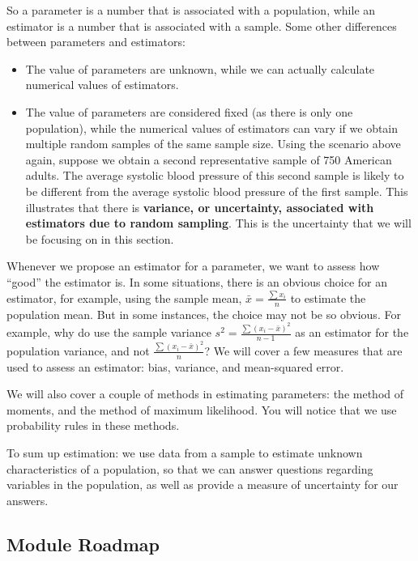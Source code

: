 \documentclass[
]{book}
\providecommand{\tightlist}{%
  \setlength{\itemsep}{0pt}\setlength{\parskip}{0pt}}
\begin{document}
So a parameter is a number that is associated with a population, while an estimator is a number that is associated with a sample. Some other differences between parameters and estimators:

\begin{itemize}
\tightlist
\item
  The value of parameters are unknown, while we can actually calculate numerical values of estimators.
\item
  The value of parameters are considered fixed (as there is only one population), while the numerical values of estimators can vary if we obtain multiple random samples of the same sample size. Using the scenario above again, suppose we obtain a second representative sample of 750 American adults. The average systolic blood pressure of this second sample is likely to be different from the average systolic blood pressure of the first sample. This illustrates that there is \textbf{variance, or uncertainty, associated with estimators due to random sampling}. This is the uncertainty that we will be focusing on in this section.
\end{itemize}

Whenever we propose an estimator for a parameter, we want to assess how ``good'' the estimator is. In some situations, there is an obvious choice for an estimator, for example, using the sample mean, \(\bar{x} = \frac{\sum x_i}{n}\) to estimate the population mean. But in some instances, the choice may not be so obvious. For example, why do use the sample variance \(s^2 = \frac{\sum (x_i - \bar{x})^2}{n-1}\) as an estimator for the population variance, and not \(\frac{\sum (x_i - \bar{x})^2}{n}\)? We will cover a few measures that are used to assess an estimator: bias, variance, and mean-squared error.

We will also cover a couple of methods in estimating parameters: the method of moments, and the method of maximum likelihood. You will notice that we use probability rules in these methods.

To sum up estimation: we use data from a sample to estimate unknown characteristics of a population, so that we can answer questions regarding variables in the population, as well as provide a measure of uncertainty for our answers.

\hypertarget{module-roadmap-5}{%
\subsection{Module Roadmap}\label{module-roadmap-5}}
\end{document}
